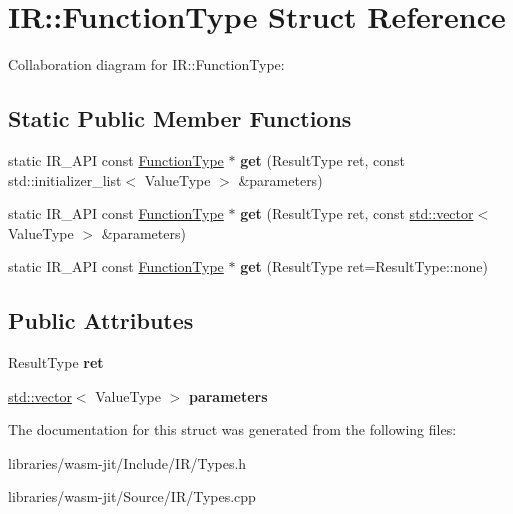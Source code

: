 \hypertarget{struct_i_r_1_1_function_type}{}\section{IR\+:\+:Function\+Type Struct Reference}
\label{struct_i_r_1_1_function_type}


Collaboration diagram for IR\+:\+:Function\+Type\+:
\subsection*{Static Public Member Functions}
\begin{DoxyCompactItemize}
\item 
\mbox{\label{struct_i_r_1_1_function_type_a97cbdf384d97c3a5203a1310c9af0822}} 
static I\+R\+\_\+\+A\+PI const \mbox{\hyperlink{struct_i_r_1_1_function_type}{Function\+Type}} $\ast$ {\bfseries get} (Result\+Type ret, const std\+::initializer\+\_\+list$<$ Value\+Type $>$ \&parameters)
\item 
\mbox{\label{struct_i_r_1_1_function_type_a2d2f734852bb2dc1fb9377bc02c20fc3}} 
static I\+R\+\_\+\+A\+PI const \mbox{\hyperlink{struct_i_r_1_1_function_type}{Function\+Type}} $\ast$ {\bfseries get} (Result\+Type ret, const \mbox{\hyperlink{classstd_1_1vector}{std\+::vector}}$<$ Value\+Type $>$ \&parameters)
\item 
\mbox{\label{struct_i_r_1_1_function_type_ae19aab83e704222b2dcc8e0b0af80f3c}} 
static I\+R\+\_\+\+A\+PI const \mbox{\hyperlink{struct_i_r_1_1_function_type}{Function\+Type}} $\ast$ {\bfseries get} (Result\+Type ret=Result\+Type\+::none)
\end{DoxyCompactItemize}
\subsection*{Public Attributes}
\begin{DoxyCompactItemize}
\item 
\mbox{\label{struct_i_r_1_1_function_type_a6f6a20ea31fb2218bcdba1bc4d6a1103}} 
Result\+Type {\bfseries ret}
\item 
\mbox{\label{struct_i_r_1_1_function_type_a92e17c58f6cd40ee5392dba1bdc2e822}} 
\mbox{\hyperlink{classstd_1_1vector}{std\+::vector}}$<$ Value\+Type $>$ {\bfseries parameters}
\end{DoxyCompactItemize}


The documentation for this struct was generated from the following files\+:\begin{DoxyCompactItemize}
\item 
libraries/wasm-\/jit/\+Include/\+I\+R/Types.\+h\item 
libraries/wasm-\/jit/\+Source/\+I\+R/Types.\+cpp\end{DoxyCompactItemize}
